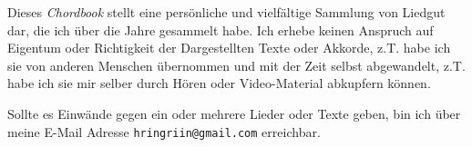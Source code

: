 \documentclass[landscape]{../TeX/Chordbook/chordbook}
\newcommand{\blankpage}{%
    \null
    \thispagestyle{empty}%
    \addtocounter{page}{-1}%
    \newpage}
\newcommand{\wpage}{\afterpage{\blankpage}}
\begin{document}

\date{\textbf{Erstellt am:} 10. Februar 2014 \\ \textbf{\"{U}berarbeitet am:} \today}
\clearpage


\maketitle \clearpage

\begin{center}
    { \Large
        \parbox{17cm}{
            Dieses \textit{Chordbook} stellt eine pers\"{o}nliche und vielf\"{a}ltige Sammlung von Liedgut dar, die ich \"{u}ber die Jahre gesammelt habe.
            Ich erhebe keinen Anspruch auf Eigentum oder Richtigkeit der Dargestellten Texte oder Akkorde, z.T. habe ich sie von anderen Menschen \"{u}bernommen und mit der Zeit selbst abgewandelt, z.T. habe ich sie mir selber durch H\"{o}ren oder Video-Material abkupfern k\"{o}nnen. \par\medskip

            Sollte es Einw\"{a}nde gegen ein oder mehrere Lieder oder Texte geben, bin ich \"{u}ber meine E-Mail Adresse \texttt{hringriin@gmail.com} erreichbar.
        }
    }
\end{center}

\clearpage

\tableofcontents \clearpage

\columnsep=3mm

\renewcommand{\snumbgcolor}{songnr}
\renewcommand{\notebgcolor}{notes}
\renewcommand\printchord[1]{\footnotesize\sffamily\textit{\textcolor{linkcolor}{{#1}}}}


\end{document}
